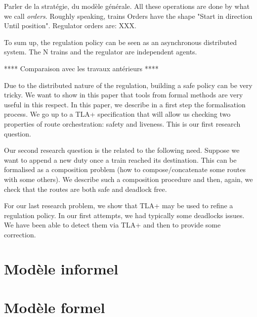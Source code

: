 \documentclass[runningheads]{llncs}
\begin{document}
 Parler de la stratégie, du modèle générale. All these operations are done by what we call  \emph{orders}. Roughly speaking, trains Orders have the shape "Start in direction Until position". Regulator orders are: XXX. 
 
 
 To sum up, the regulation policy can be seen as an asynchronous distributed system. The N trains and the regulator are independent agents.
 
 
 **** Comparaison avec les travaux antérieurs ****
 
 
Due to the distributed nature of the regulation, building a safe policy can be very tricky. We want to show in this paper that tools from formal methods are very useful in this respect.  In this paper, we describe in  a first step the formalisation process. We go up to a TLA+ specification that will allow us checking two properties of route orchestration: safety and liveness. This is our first research question. 

Our second research question is the related to the following need. Suppose we want to append a new duty once a train reached its destination. This can be formalised as a composition problem (how to compose/concatenate some routes with some others). We describe such a composition procedure and then, again, we check that the routes are both safe and deadlock free. 

For our last research problem, we show that TLA+ may be used to refine a regulation policy. In our first attempts, we had typically some deadlocks issues. We have been able to detect them via TLA+ and then to provide some correction. 




\section{Modèle informel}
\label{sec:informal-model}


\section{Modèle formel}
\label{sec:formal-model}
\end{document}
